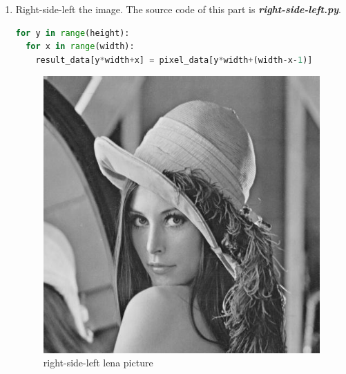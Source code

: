 \documentclass[12pt,twoside,a4paper]{article}
\begin{document}
\begin{enumerate}
\item
Right-side-left the image. The source code of this part is \textit{\textbf{right-side-left.py}}.
\begin{lstlisting}[language=Python]
for y in range(height):
  for x in range(width):
    result_data[y*width+x] = pixel_data[y*width+(width-x-1)]
\end{lstlisting}
\begin{figure}[H]
\centering
\includegraphics[scale=0.4]{lena-rl.jpg}
\caption{right-side-left lena picture}
\label{fig:lena-rl.jpg}
\end{figure}


\end{enumerate}
\end{document}
